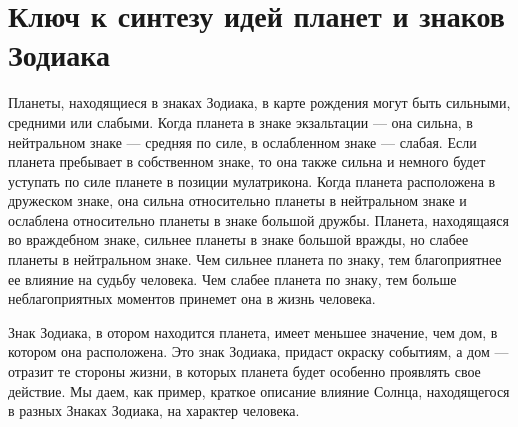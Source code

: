 \section{Ключ к синтезу идей планет и знаков Зодиака}

Планеты, находящиеся в знаках Зодиака, в карте рождения могут быть сильными, средними или слабыми. Когда планета в знаке экзальтации --- она сильна, в нейтральном знаке --- средняя по силе, в ослабленном знаке --- слабая. Если планета пребывает в собственном знаке, то она также сильна и немного будет уступать по силе планете в позиции мулатрикона. Когда планета расположена в дружеском знаке, она сильна относительно планеты в нейтральном знаке и ослаблена относительно планеты в знаке большой дружбы. Планета, находящаяся во враждебном знаке, сильнее планеты в знаке большой вражды, но слабее планеты в нейтральном знаке. Чем сильнее планета по знаку, тем благоприятнее ее влияние на судьбу человека. Чем слабее планета по знаку, тем больше неблагоприятных моментов принемет она в жизнь человека.

Знак Зодиака, в отором находится планета, имеет меньшее значение, чем дом, в котором она расположена. Это знак Зодиака, придаст окраску событиям, а дом --- отразит те стороны жизни, в которых планета будет особенно проявлять свое действие. Мы даем, как пример, краткое описание влияние Солнца, находящегося в разных Знаках Зодиака, на характер человека.

